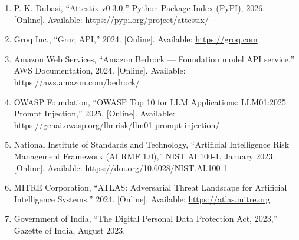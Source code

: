 \begin{enumerate}
\vspace{0.3cm}

\item P. K. Dubasi, ``Attestix v0.3.0,'' Python Package Index (PyPI), 2026. [Online]. Available: \url{https://pypi.org/project/attestix/}

\vspace{0.3cm}

\item Groq Inc., ``Groq API,'' 2024. [Online]. Available: \url{https://groq.com}

\vspace{0.3cm}

\item Amazon Web Services, ``Amazon Bedrock --- Foundation model API service,'' AWS Documentation, 2024. [Online]. Available: \url{https://aws.amazon.com/bedrock/}

\vspace{0.3cm}

\item OWASP Foundation, ``OWASP Top 10 for LLM Applications: LLM01:2025 Prompt Injection,'' 2025. [Online]. Available: \url{https://genai.owasp.org/llmrisk/llm01-prompt-injection/}

\vspace{0.3cm}

\item National Institute of Standards and Technology, ``Artificial Intelligence Risk Management Framework (AI RMF 1.0),'' NIST AI 100-1, January 2023. [Online]. Available: \url{https://doi.org/10.6028/NIST.AI.100-1}

\vspace{0.3cm}

\item MITRE Corporation, ``ATLAS: Adversarial Threat Landscape for Artificial Intelligence Systems,'' 2024. [Online]. Available: \url{https://atlas.mitre.org}

\vspace{0.3cm}

\item Government of India, ``The Digital Personal Data Protection Act, 2023,'' Gazette of India, August 2023.

\end{enumerate}
